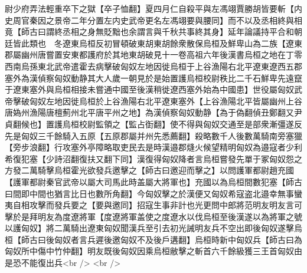 尉少府弄法輕重卒下之獄【卒子恤翻】夏四月仁自殺平與左馮翊賈勝胡皆要斬【内史周官秦因之景帝二年分置左内史武帝更名左馮翊要與腰同】而不以及丞相終與相竟【師古曰謂終丞相之身無貶黜也余謂言與千秋共事終其身】延年論議持平合和朝廷皆此類也　冬遼東烏桓反初冒頓破東胡東胡餘衆散保烏桓及鮮卑山為二族【遼東郡屬幽州唐嘗置安東都護府於其地東胡破見十一卷高祖六年後漢書烏桓之地在丁零西南烏孫東北武帝遣霍去病擊破匈奴左地因徙烏桓于上谷漁陽右北平遼東遼西五郡塞外為漢偵察匈奴動静其大人歲一朝見於是始置護烏桓校尉秩比二千石鮮卑先遠竄于遼東塞外與烏桓相接未嘗通中國至後漢稍徙遼西塞外始為中國患】世役屬匈奴武帝擊破匈奴左地因徙烏桓於上谷漁陽右北平遼東塞外【上谷漁陽北平皆屬幽州上谷唐媯州漁陽唐檀薊州北平唐平州之地】為漢偵察匈奴動静【為于偽翻偵丑鄭翻又尹貞翻候也】置護烏桓校尉監領之【監占衘翻】使不得與匈奴交通至是部衆漸彊遂反先是匈奴三千餘騎入五原【五原郡屬并州先悉薦翻】殺略數千人後數萬騎南旁塞獵【旁步浪翻】行攻塞外亭障略取吏民去是時漢邉郡熢火候望精明匈奴為邉寇者少利希復犯塞【少詩沼翻復扶又翻下同】漢復得匈奴降者言烏桓嘗發先單于冢匈奴怨之方發二萬騎擊烏桓霍光欲發兵邀擊之【師古曰邀迎而擊之】以問護軍都尉趙充國【護軍都尉秦官武帝以屬大司馬此時盖屬大將軍也】充國以為烏桓間數犯塞【師古曰間即中間也猶言比日也數所角翻】今匈奴擊之於漢便又匈奴希寇盗北邉幸無事蠻夷自相攻擊而發兵要之【要與邀同】招寇生事非計也光更問中郎將范明友明友言可擊於是拜明友為度遼將軍【度遼將軍盖使之度遼水以伐烏桓至後漢遂以為將軍之號以護匈奴】將二萬騎出遼東匈奴聞漢兵至引去初光誡明友兵不空出即後匈奴遂擊烏桓【師古曰後匈奴者言兵遲後邀匈奴不及後戶遘翻】烏桓時新中匈奴兵【師古曰為匈奴所中傷中竹仲翻】明友既後匈奴因乘烏桓敝擊之斬首六千餘級獲三王首匈奴由是恐不能復出兵<br />
<br />
